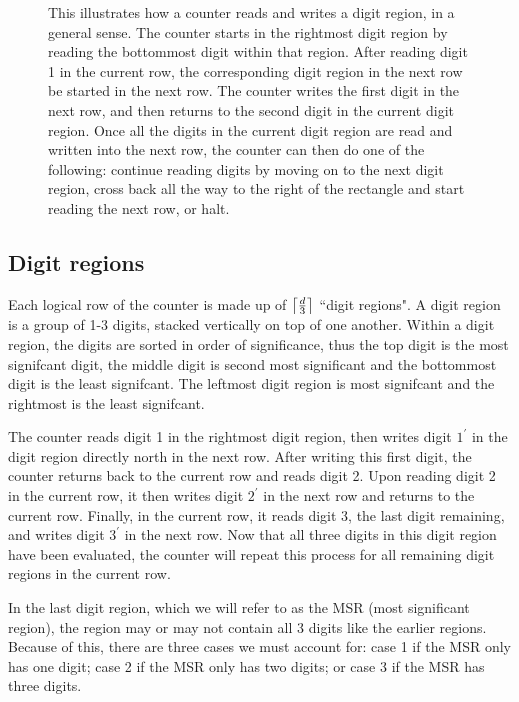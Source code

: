 \begin{figure}[H]\ContinuedFloat
    \caption{\label{fig:counter_read_digit_return_read_digit_general_case3}
    This illustrates how a counter reads and writes a digit region, in a general sense.
    The counter starts in the rightmost digit region by reading the bottommost digit within
    that region. After reading digit 1 in the current row, the corresponding digit region in
    the next row be started in the next row. The counter writes the first digit in the next
    row, and then returns to the second digit in the current digit region.
    Once all the digits in the current digit region are read and written into the next row,
    the counter can then do one of the following: continue reading digits by moving on to the
    next digit region, cross back all the way to the right of the rectangle and start reading
    the next row, or halt.}
\end{figure}

\subsection{Digit regions}

Each logical row of the counter is made up of $\ceil*{\frac{d}{3}}$ ``digit regions".
%
A digit region is a group of 1-3 digits, stacked vertically on top of one another.
%
Within a digit region, the digits are sorted in order of significance, thus the top digit is the most signifcant digit, the middle digit
is second most significant and the bottommost digit is the least signifcant.
%
The leftmost digit region is most signifcant and the rightmost is the least signifcant.
%

The counter reads digit 1 in the rightmost digit region, then writes digit $1^\prime$ in the digit region directly north in the next row.
%
After writing this first digit, the counter returns back to the current row and reads digit 2.
%
Upon reading digit 2 in the current row, it then writes digit $2^\prime$ in the next row and returns to the current row.
%
Finally, in the current row, it reads digit 3, the last digit remaining, and writes digit $3^\prime$ in the next row.
%
Now that all three digits in this digit region have been evaluated, the counter will repeat this process for all remaining digit regions in the current row.
%

In the last digit region, which we will refer to as the MSR (most significant region), the region may or may not contain all 3 digits like the earlier regions.
%
Because of this, there are three cases we must account for: case 1 if the MSR only has one digit; case 2 if the MSR only has two digits; or case 3 if the MSR has three digits.
%

